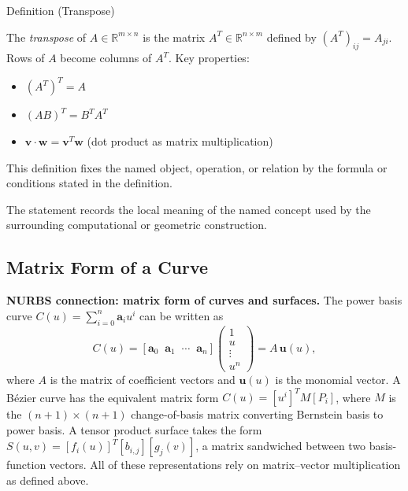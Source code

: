 \begin{definitionbox}{Definition (Transpose)}
\begin{definition}[Transpose]
\label{def:matrix-transpose}
The \emph{transpose} of $A \in \mathbb{R}^{m \times n}$ is the matrix
$A^T \in \mathbb{R}^{n \times m}$ defined by $(A^T)_{ij} = A_{ji}$.
Rows of $A$ become columns of $A^T$.
Key properties:
\begin{itemize}
  \item $(A^T)^T = A$
  \item $(AB)^T = B^T A^T$
  \item $\mathbf{v} \cdot \mathbf{w} = \mathbf{v}^T \mathbf{w}$ (dot product as matrix multiplication)
\end{itemize}
\end{definition}
\end{definitionbox}
\begin{remark*}
This definition fixes the named object, operation, or relation by the formula
or conditions stated in the definition.
\end{remark*}

\begin{remark*}[Interpretation]
The statement records the local meaning of the named concept used by the
surrounding computational or geometric construction.
\end{remark*}

\DefinitionalRoot

\subsection*{Matrix Form of a Curve}

\begin{remark*}[Exposition]
\textbf{NURBS connection: matrix form of curves and surfaces.}
The power basis curve $C(u) = \sum_{i=0}^n \mathbf{a}_i u^i$ can be written as
\[
  C(u) = [\mathbf{a}_0 \;\; \mathbf{a}_1 \;\; \cdots \;\; \mathbf{a}_n]
  \begin{pmatrix} 1 \\ u \\ \vdots \\ u^n \end{pmatrix}
  = A \,\mathbf{u}(u),
\]
where $A$ is the matrix of coefficient vectors and $\mathbf{u}(u)$ is the monomial
vector.
A B\'{e}zier curve has the equivalent matrix form $C(u) = [u^i]^T M [P_i]$,
where $M$ is the $(n+1)\times(n+1)$ change-of-basis matrix converting
Bernstein basis to power basis.
A tensor product surface takes the form
$S(u,v) = [f_i(u)]^T [b_{i,j}] [g_j(v)]$,
a matrix sandwiched between two basis-function vectors.
All of these representations rely on matrix--vector multiplication as
defined above.
\end{remark*}
